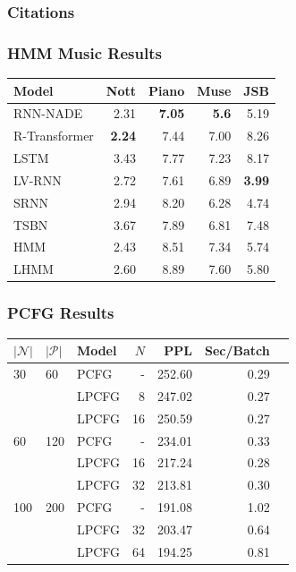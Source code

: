 \documentclass{beamer}
\begin{document}
\begin{frame}[allowframebreaks]
\frametitle{Citations}
\printbibliography
\end{frame}


\begin{frame}
\frametitle{HMM Music Results}
\centering
\begin{tabular}{lrrrr}
\toprule
Model       & Nott & Piano & Muse & JSB \\
\midrule
RNN-NADE & 2.31  & \textbf{7.05}        & \textbf{5.6}        & 5.19          \\
R-Transformer & \textbf{2.24} & 7.44 & 7.00 & 8.26 \\
LSTM  & 3.43 & 7.77   & 7.23 & 8.17     \\
LV-RNN    & 2.72       & 7.61        & 6.89       &\textbf{ 3.99}\\
SRNN     & 2.94       & 8.20         & 6.28       & 4.74          \\
\midrule
TSBN     & 3.67       & 7.89        & 6.81       & 7.48          \\
HMM &  2.43 & 8.51 & 7.34 & 5.74 \\
LHMM & 2.60 & 8.89 & 7.60 & 5.80 \\
\bottomrule
\end{tabular}
\end{frame}

\begin{frame}
\frametitle{PCFG Results}

\begin{center}
\begin{tabular} {lllrrrr}
\toprule
$|\mathcal{N}|$ & $|\mathcal{P}|$ & Model & $N$ &  PPL & Sec/Batch\\
\midrule
30  & 60    & PCFG & - & 252.60 & 0.29\\
    &       & LPCFG & 8 &  247.02    & 0.27\\
    &       & LPCFG & 16 & 250.59    & 0.27\\
\midrule
60  & 120   & PCFG & - & 234.01 & 0.33\\
    &       & LPCFG & 16& 217.24 & 0.28\\
    &       & LPCFG & 32& 213.81 & 0.30\\
\midrule
100 & 200   & PCFG & - &  191.08   & 1.02\\
    &       & LPCFG & 32& 203.47 & 0.64\\
    &       & LPCFG & 64& 194.25 & 0.81\\
\bottomrule
\end{tabular}
\end{center}
\end{frame}
\end{document}
